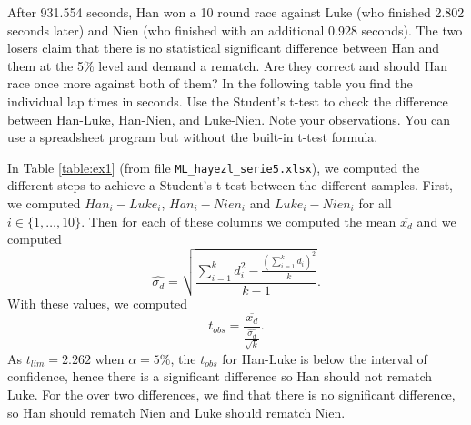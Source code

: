 \documentclass[fontsize=12pt, usenames, dvipsnames, headinclude, headsepline, footinclude, footsepline]{scrartcl}
\title{\normalfont{\bfseries{Machine Learning: Homework 5}}}
\author{Laurent \textsc{Hayez}}
\date{\today}
\begin{document}
\renewcommand{\labelitemi}{\textbullet}



\maketitle




\begin{exo}
  After 931.554 seconds, Han won a 10 round race against Luke (who finished 2.802 seconds later) and Nien (who
  finished with an additional 0.928 seconds). The two losers claim that there is no statistical significant
  difference between Han and them at the 5\% level and demand a rematch. Are they correct and should Han race
  once more against both of them? In the following table you find the individual lap times in seconds. Use the
  Student’s t-test to check the difference between Han-Luke, Han-Nien, and Luke-Nien. Note your
  observations. You can use a spreadsheet program but without the built-in t-test formula.
\end{exo}

  \begin{sol}
    In Table \ref{table:ex1} (from file \texttt{ML\_hayezl\_serie5.xlsx}), we computed the different steps to achieve a Student's t-test between the
    different samples. First, we computed $Han_i - Luke_i$, $Han_i - Nien_i$ and $Luke_i - Nien_i$ for all $i
    \in \{1, \ldots, 10\}$. Then for each of these columns we computed the mean $\overline{x_d}$ and we computed
    \[\widehat{\sigma_d} = \sqrt{\frac{\sum_{i=1}^k d_i^2 - \frac{\left(\sum_{i=1}^k
            d_i\right)^2}{k}}{k-1}}.\]
    With these values, we computed 
    \[ t_{obs} = \frac{\overline{x_d}}{\frac{\widehat{\sigma_d}}{\sqrt{k}}}.\]
    As $t_{lim} = 2.262$ when $\alpha = 5\%$, the $t_{obs}$ for Han-Luke is below the interval of confidence,
    hence there is a significant difference so Han should not rematch Luke. For the over two differences, we
    find that there is no significant difference, so Han should rematch Nien and Luke should rematch Nien.
  \end{sol}
\end{document}
